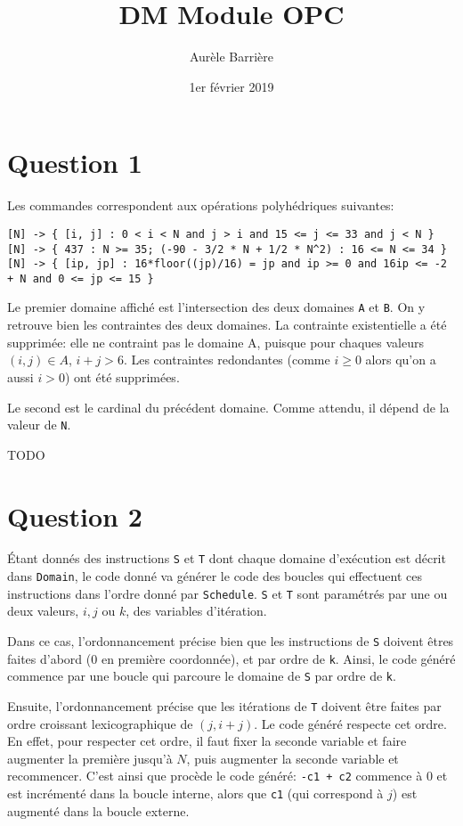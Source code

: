 \documentclass{article}
\title{DM Module OPC}
\author{Aur\`ele Barri\`ere}
\date{1er février 2019}
\begin{document}
\maketitle

\section*{Question 1}
Les commandes correspondent aux opérations polyhédriques suivantes:
\begin{lstlisting}
[N] -> { [i, j] : 0 < i < N and j > i and 15 <= j <= 33 and j < N }
[N] -> { 437 : N >= 35; (-90 - 3/2 * N + 1/2 * N^2) : 16 <= N <= 34 }
[N] -> { [ip, jp] : 16*floor((jp)/16) = jp and ip >= 0 and 16ip <= -2 + N and 0 <= jp <= 15 }
\end{lstlisting}

Le premier domaine affiché est l'intersection des deux domaines \lstinline{A} et \lstinline{B}.
On y retrouve bien les contraintes des deux domaines. La contrainte existentielle a été supprimée: elle ne contraint pas le domaine A, puisque pour chaques valeurs $(i,j)\in A$, $i+j>6$. Les contraintes redondantes (comme $i\geq 0$ alors qu'on a aussi $i>0$) ont été supprimées.

Le second est le cardinal du précédent domaine. Comme attendu, il dépend de la valeur de \lstinline{N}.

TODO

\section*{Question 2}

Étant donnés des instructions \lstinline{S} et \lstinline{T} dont chaque domaine d'exécution est décrit dans \lstinline{Domain}, le code donné va générer le code des boucles qui effectuent ces instructions dans l'ordre donné par \lstinline{Schedule}. \lstinline{S} et \lstinline{T} sont paramétrés par une ou deux valeurs, $i,j$ ou $k$, des variables d'itération.

Dans ce cas, l'ordonnancement précise bien que les instructions de \lstinline{S} doivent êtres faites d'abord (0 en première coordonnée), et par ordre de \lstinline{k}.
Ainsi, le code généré commence par une boucle qui parcoure le domaine de \lstinline{S} par ordre de \lstinline{k}.

Ensuite, l'ordonnancement précise que les itérations de \lstinline{T} doivent être faites par ordre croissant lexicographique de $(j,i+j)$.
Le code généré respecte cet ordre.
En effet, pour respecter cet ordre, il faut fixer la seconde variable et faire augmenter la première jusqu'à $N$, puis augmenter la seconde variable et recommencer.
C'est ainsi que procède le code généré: \lstinline{-c1 + c2} commence à 0 et est incrémenté dans la boucle interne, alors que \lstinline{c1} (qui correspond à $j$) est augmenté dans la boucle externe.
\end{document}
